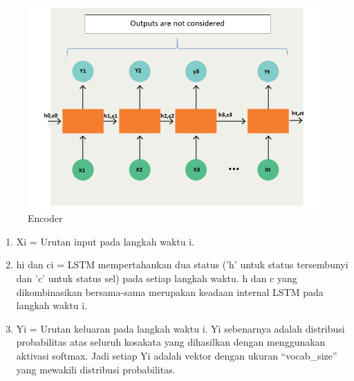 \begin{figure}[H]
        \centerline{\includegraphics[scale=.45]{figures/lstm}}
        \caption{Encoder}
		\label{encoder}
\end{figure}

\begin{enumerate}
\item Xi = Urutan input pada langkah waktu i.
\item hi dan ci = LSTM mempertahankan dua status ('h' untuk status tersembunyi dan 'c' untuk status sel) pada setiap langkah waktu. h dan c yang dikombinasikan bersama-sama merupakan keadaan internal LSTM pada langkah waktu i.
\item Yi = Urutan keluaran pada langkah waktu i. Yi sebenarnya adalah distribusi probabilitas atas seluruh kosakata yang dihasilkan dengan menggunakan aktivasi softmax. Jadi setiap Yi adalah vektor dengan ukuran “vocab\_size” yang mewakili distribusi probabilitas.
\end{enumerate}

